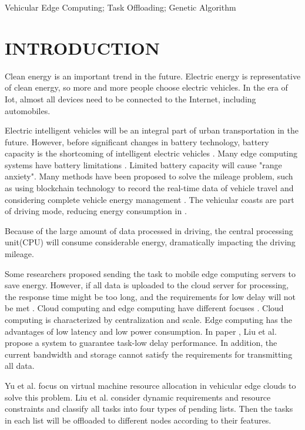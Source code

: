 \documentclass[conference]{IEEEtran}
\begin{document}
	\begin{IEEEkeywords}
		Vehicular Edge Computing; Task Offloading; Genetic Algorithm
	\end{IEEEkeywords}
	
	\section{INTRODUCTION}
	\citeauthor{zhang2022local}\citeyear{zhang2022local}
	Clean energy is an important trend in the future. Electric energy is representative of clean energy, so more and more people choose electric vehicles. In the era of Iot, almost all devices need to be connected to the Internet, including automobiles. 
	
	Electric intelligent vehicles will be an integral part of urban transportation in the future. However, before significant changes in battery technology, battery capacity is the shortcoming of intelligent electric vehicles \cite{battery}. Many edge computing systems have battery limitations \cite{zhang2022local}. 
	Limited battery capacity will cause "range anxiety". 
	Many methods have been proposed to solve the mileage problem, such as using blockchain technology to record the real-time data of vehicle travel \cite{zhang2022truthful} and considering complete vehicle energy management \cite{complete}. The vehicular coasts are part of driving mode, reducing energy consumption in \cite{coast}. 
	
	Because of the large amount of data processed in driving, the central processing unit(CPU) will consume considerable energy, dramatically impacting the driving mileage. 
	
	Some researchers proposed sending the task to mobile edge computing servers to save energy. 
	However, if all data is uploaded to the cloud server for processing, the response time might be too long, and the requirements for low delay will not be met \cite{2021v2mec}. 
	Cloud computing and edge computing have different focuses \cite{zhang2022strategy}. Cloud computing is characterized by centralization and scale. Edge computing has the advantages of low latency and low power consumption. 
	In paper \cite{edgeserver}, Liu et al. propose a system to guarantee task-low delay performance. 
	In addition, the current bandwidth and storage cannot satisfy the requirements for transmitting all data. 
	
	Yu et al. \cite{yu2013toward} focus on virtual machine resource allocation in vehicular edge clouds to solve this problem. 
	Liu et al. \cite{liu2020fourtypes} consider dynamic requirements and resource constraints and classify all tasks into four types of pending lists. Then the tasks in each list will be offloaded to different nodes according to their features. 
	
\end{document}
